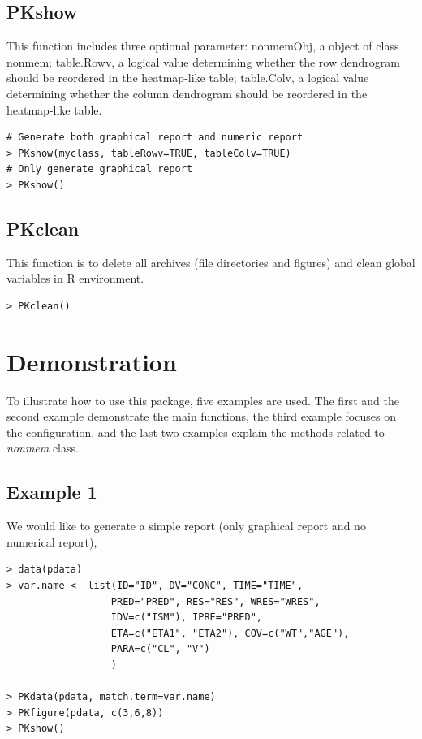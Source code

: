 \documentclass[a4paper]{article}
\begin{document}
\subsection{PKshow}
This function includes three optional parameter: nonmemObj, a object of class nonmem; 
table.Rowv, a logical value determining whether the row dendrogram should be reordered 
in the heatmap-like table; table.Colv, a logical value determining whether the column 
dendrogram should be reordered in the heatmap-like table.

\begin{verbatim}
# Generate both graphical report and numeric report
> PKshow(myclass, tableRowv=TRUE, tableColv=TRUE)
# Only generate graphical report
> PKshow() 
\end{verbatim}

\subsection{PKclean}
This function is to delete all archives (file directories and figures) and clean global variables in R environment. 
\begin{verbatim}
> PKclean()
\end{verbatim}

\section{Demonstration}
To illustrate how to use this package, five examples are used. 
The first and the second example demonstrate the main functions, 
the third example focuses on the configuration, and the last two examples 
explain the methods related to \textit{nonmem} class.
\subsection{Example 1}
We would like to generate a simple report (only graphical report and no numerical report),
\begin{verbatim}
> data(pdata)
> var.name <- list(ID="ID", DV="CONC", TIME="TIME", 
				  PRED="PRED", RES="RES", WRES="WRES",
                  IDV=c("ISM"), IPRE="PRED",
                  ETA=c("ETA1", "ETA2"), COV=c("WT","AGE"),
                  PARA=c("CL", "V")
                  )
                  
> PKdata(pdata, match.term=var.name)
> PKfigure(pdata, c(3,6,8))
> PKshow()
\end{verbatim}
\end{document}

